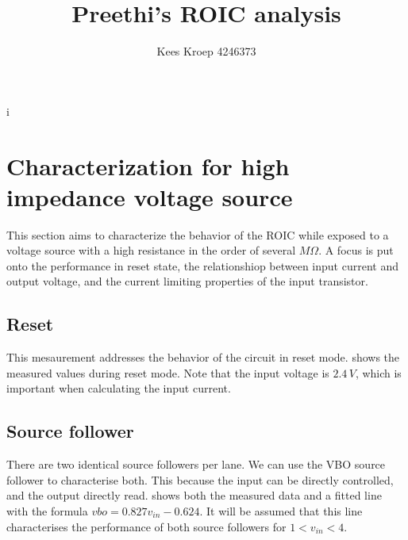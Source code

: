 \documentclass{article}
\title{Preethi's ROIC analysis}
\author{Kees Kroep 4246373}
\begin{document}
  \maketitle
i

% 
% 
% 
% 

\clearpage

\section{Characterization for high impedance voltage source}
This section aims to characterize the behavior of the ROIC while exposed to a voltage source with a high resistance in the order of several $M\Omega$. A focus is put onto the performance in reset state, the relationshiop between input current and output voltage, and the current limiting properties of the input transistor.

\subsection{Reset}
This mesaurement addresses the behavior of the circuit in reset mode.  shows the measured values during reset mode. Note that the input voltage is $2.4\,V$, which is important when calculating the input current. 




\subsection{Source follower}
There are two identical source followers per lane. We can use the VBO source follower to characterise both. This because the input can be directly controlled, and the output directly read.  shows both the measured data and a fitted line with the formula $vbo=0.827v_{in}-0.624$. It will be assumed that this line characterises the performance of both source followers for $1<v_{in}<4$.
\end{document}
